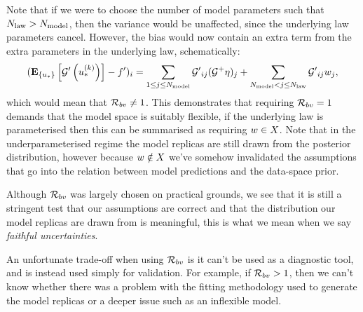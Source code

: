 Note that if we were to choose the
number of model parameters such that $N_{\rm law} > N_{\rm model}$, then the variance
would be unaffected, since the underlying law parameters cancel. However, the
bias would now contain an extra term from the extra parameters in the
underlying law, schematically:
\begin{equation}
    \begin{split}
        (\mathbf{E}_{\{ u_* \}} \left[ {{\mathcal{G}}^{\prime}}\left(u_*^{(k)}\right) \right] - {{f}^{\prime}})_i =
        \sum_{1 \leq j \leq N_{\rm model}} {{\mathcal{G}}^{\prime}}_{ij} (\mathcal{G}^+ \eta)_j +
        \sum_{N_{\rm model} < j \leq N_{\rm law}} {{\mathcal{G}}^{\prime}}_{ij} w_j,
    \end{split}
\end{equation}
which would mean that $\mathcal{R}_{bv} \neq 1$. This demonstrates that requiring
$\mathcal{R}_{bv} = 1$ demands that the model space is suitably flexible, if the
underlying law is parameterised then this can be summarised as requiring
$w \in X$. Note that in the
underparameterised regime the model replicas are still drawn from the posterior
distribution, however because $w \notin X$ we've somehow
invalidated the assumptions that go into the relation between model predictions
and the data-space prior.

Although $\mathcal{R}_{bv}$ was largely chosen on practical
grounds, we see that it is still a stringent test that our assumptions are
correct and that the distribution our model replicas are drawn from is meaningful,
this is what we mean when we say {\em faithful uncertainties}.

An unfortunate
trade-off when using $\mathcal{R}_{bv}$ is it can't be used as a diagnostic
tool, and is instead used simply for validation. For example, if
$\mathcal{R}_{bv} > 1$, then we
can't know whether there was a problem with the fitting methodology used to
generate the model replicas or a deeper issue such as an inflexible model.
